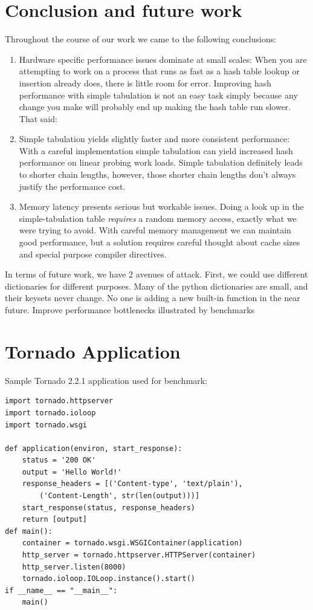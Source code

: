 \documentclass[11pt]{article}
\begin{document}
\section{Conclusion and future work}
Throughout the course of our work we came to the following conclusions:
\begin{enumerate}
\item Hardware specific performance issues dominate at small scales: When you are attempting to work on a process that runs as fast as a hash table lookup or insertion already does, there is little room for error.  Improving hash performance with simple tabulation is not an easy task simply because any change you make will probably end up making the hash table run slower.  That said:

\item Simple tabulation yields slightly faster and more consistent performance: With a careful implementation simple tabulation can yield increased hash performance on linear probing work loads. Simple tabulation definitely leads to shorter chain lengths, however, those shorter chain lengths don’t always justify the performance cost.

\item Memory latency presents serious but workable issues.  Doing a look up in the simple-tabulation table \emph{requires} a random memory access, exactly what we were trying to avoid. With careful memory management we can maintain good performance, but a solution requires careful thought about cache sizes and special purpose compiler directives.

\end{enumerate}

In terms of future work, we have 2 avenues of attack. First, we could use different dictionaries for different purposes. Many of the python dictionaries are small, and their keysets never change. No one is adding a new built-in function in the near future. 
Improve performance bottlenecks illustrated by benchmarks

\appendix
\section{Tornado Application}
Sample Tornado 2.2.1 application used for benchmark:
 \begin{verbatim}
import tornado.httpserver
import tornado.ioloop
import tornado.wsgi

def application(environ, start_response):
    status = '200 OK'
    output = 'Hello World!' 
    response_headers = [('Content-type', 'text/plain'),
        ('Content-Length', str(len(output)))]
    start_response(status, response_headers)
    return [output]
def main():
    container = tornado.wsgi.WSGIContainer(application)
    http_server = tornado.httpserver.HTTPServer(container)
    http_server.listen(8000)
    tornado.ioloop.IOLoop.instance().start()
if __name__ == "__main__":
    main()
 \end{verbatim}
\appendix
\end{document}
